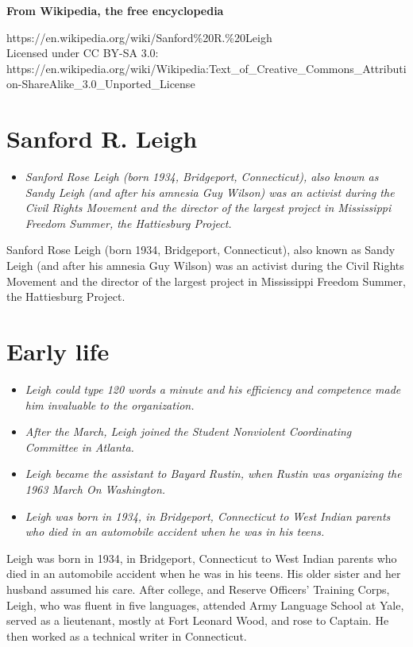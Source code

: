 \textbf{From Wikipedia, the free encyclopedia}

https://en.wikipedia.org/wiki/Sanford\%20R.\%20Leigh\\
Licensed under CC BY-SA 3.0:\\
https://en.wikipedia.org/wiki/Wikipedia:Text\_of\_Creative\_Commons\_Attribution-ShareAlike\_3.0\_Unported\_License

\section{Sanford R. Leigh}\label{sanford-r.-leigh}

\begin{itemize}
\item
  \emph{Sanford Rose Leigh (born 1934, Bridgeport, Connecticut), also
  known as Sandy Leigh (and after his amnesia Guy Wilson) was an
  activist during the Civil Rights Movement and the director of the
  largest project in Mississippi Freedom Summer, the Hattiesburg
  Project.}
\end{itemize}

Sanford Rose Leigh (born 1934, Bridgeport, Connecticut), also known as
Sandy Leigh (and after his amnesia Guy Wilson) was an activist during
the Civil Rights Movement and the director of the largest project in
Mississippi Freedom Summer, the Hattiesburg Project.

\section{Early life}\label{early-life}

\begin{itemize}
\item
  \emph{Leigh could type 120 words a minute and his efficiency and
  competence made him invaluable to the organization.}
\item
  \emph{After the March, Leigh joined the Student Nonviolent
  Coordinating Committee in Atlanta.}
\item
  \emph{Leigh became the assistant to Bayard Rustin, when Rustin was
  organizing the 1963 March On Washington.}
\item
  \emph{Leigh was born in 1934, in Bridgeport, Connecticut to West
  Indian parents who died in an automobile accident when he was in his
  teens.}
\end{itemize}

Leigh was born in 1934, in Bridgeport, Connecticut to West Indian
parents who died in an automobile accident when he was in his teens. His
older sister and her husband assumed his care. After college, and
Reserve Officers' Training Corps, Leigh, who was fluent in five
languages, attended Army Language School at Yale, served as a
lieutenant, mostly at Fort Leonard Wood, and rose to Captain. He then
worked as a technical writer in Connecticut.

